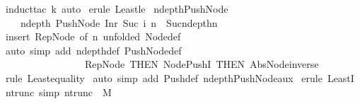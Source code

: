 \begin{isabellebody}
%
\isadelimproof
%
\endisadelimproof
%
\isatagproof
{}\isamarkupfalse%
\ {\isacharparenleft}induct{\isacharunderscore}tac\ {\isachardoublequoteopen}k{\isachardoublequoteclose}{\isacharcomma}\ auto{\isacharparenright}\isanewline
{}\isamarkupfalse%
\ {\isacharparenleft}erule\ Least{\isacharunderscore}le{\isacharparenright}\isanewline
{}\isamarkupfalse%
%
\endisatagproof
{\isafoldproof}%
%
\isadelimproof
\isanewline
%
\endisadelimproof
\isanewline
{}\isamarkupfalse%
\ ndepth{\isacharunderscore}Push{\isacharunderscore}Node{\isacharcolon}\ \isanewline
\ \ \ \ {\isachardoublequoteopen}ndepth\ {\isacharparenleft}Push{\isacharunderscore}Node\ {\isacharparenleft}Inr\ {\isacharparenleft}Suc\ i{\isacharparenright}{\isacharparenright}\ n{\isacharparenright}\ {\isacharequal}\ Suc{\isacharparenleft}ndepth{\isacharparenleft}n{\isacharparenright}{\isacharparenright}{\isachardoublequoteclose}\isanewline
%
\isadelimproof
%
\endisadelimproof
%
\isatagproof
{}\isamarkupfalse%
\ {\isacharparenleft}insert\ Rep{\isacharunderscore}Node\ {\isacharbrackleft}of\ n{\isacharcomma}\ unfolded\ Node{\isacharunderscore}def{\isacharbrackright}{\isacharparenright}\isanewline
{}\isamarkupfalse%
\ {\isacharparenleft}auto\ simp\ add{\isacharcolon}\ ndepth{\isacharunderscore}def\ Push{\isacharunderscore}Node{\isacharunderscore}def\isanewline
\ \ \ \ \ \ \ \ \ \ \ \ \ \ \ \ \ Rep{\isacharunderscore}Node\ {\isacharbrackleft}THEN\ Node{\isacharunderscore}Push{\isacharunderscore}I{\isacharcomma}\ THEN\ Abs{\isacharunderscore}Node{\isacharunderscore}inverse{\isacharbrackright}{\isacharparenright}\isanewline
{}\isamarkupfalse%
\ {\isacharparenleft}rule\ Least{\isacharunderscore}equality{\isacharparenright}\isanewline
{}\isamarkupfalse%
\ {\isacharparenleft}auto\ simp\ add{\isacharcolon}\ Push{\isacharunderscore}def\ ndepth{\isacharunderscore}Push{\isacharunderscore}Node{\isacharunderscore}aux{\isacharparenright}\isanewline
{}\isamarkupfalse%
\ {\isacharparenleft}erule\ LeastI{\isacharparenright}\isanewline
{}\isamarkupfalse%
%
\endisatagproof
{\isafoldproof}%
%
\isadelimproof
\isanewline
%
\endisadelimproof
\isanewline
\isanewline
\isanewline
\isanewline
{}\isamarkupfalse%
\ ntrunc{\isacharunderscore}{}\ {\isacharbrackleft}simp{\isacharbrackright}{\isacharcolon}\ {\isachardoublequoteopen}ntrunc\ {}\ M\ {\isacharequal}\ {\isacharbraceleft}{\isacharbraceright}{\isachardoublequoteclose}\isanewline
%
\isadelimproof

\end{isabellebody}
